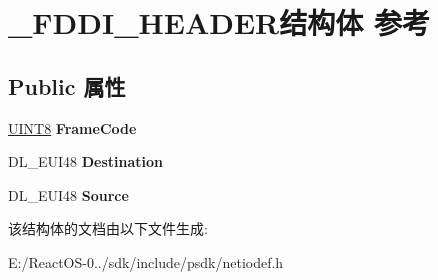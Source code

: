 \hypertarget{struct___f_d_d_i___h_e_a_d_e_r}{}\section{\+\_\+\+F\+D\+D\+I\+\_\+\+H\+E\+A\+D\+E\+R结构体 参考}
\label{struct___f_d_d_i___h_e_a_d_e_r}
\subsection*{Public 属性}
\begin{DoxyCompactItemize}
\item 
\mbox{\label{struct___f_d_d_i___h_e_a_d_e_r_a14153c94b4d6fafddcbe13d3f9ad30ec}} 
\hyperlink{_processor_bind_8h_ab27e9918b538ce9d8ca692479b375b6a}{U\+I\+N\+T8} {\bfseries Frame\+Code}
\item 
\mbox{\label{struct___f_d_d_i___h_e_a_d_e_r_a1c811e472ef5bb01f52445bff8d64f32}} 
D\+L\+\_\+\+E\+U\+I48 {\bfseries Destination}
\item 
\mbox{\label{struct___f_d_d_i___h_e_a_d_e_r_a09ebc8346db3110cdd0221600fc5d5bc}} 
D\+L\+\_\+\+E\+U\+I48 {\bfseries Source}
\end{DoxyCompactItemize}


该结构体的文档由以下文件生成\+:\begin{DoxyCompactItemize}
\item 
E\+:/\+React\+O\+S-\/0../sdk/include/psdk/netiodef.\+h\end{DoxyCompactItemize}
